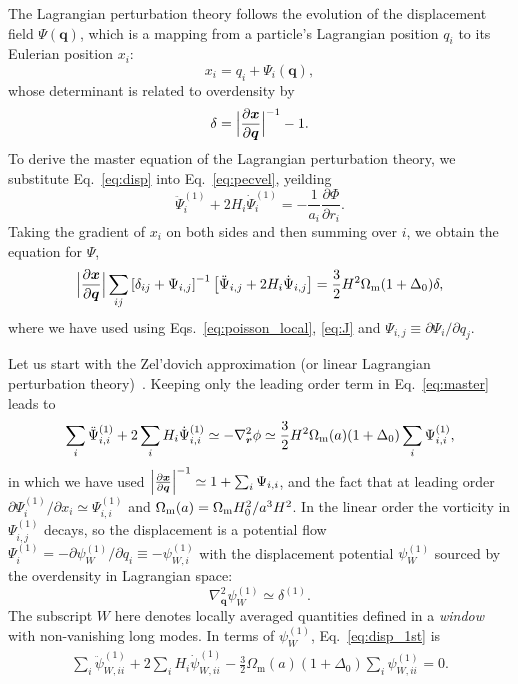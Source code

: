 \documentclass[a4paper,11pt]{article}
\newcommand{\vr}{{\bm r}}
\newcommand{\vx}{{\bm x}}
\newcommand{\vq}{{\bm q}}
\begin{document}
The Lagrangian perturbation theory follows the evolution of the displacement field $\Psi(\vq)$,
which is a mapping from a particle's Lagrangian
position $q_i$ to its Eulerian position $x_i$:
\begin{equation}
    x_i = q_i + \Psi_i({\vq}),
    \label{eq:disp}
\end{equation}
whose determinant is related to overdensity by
\begin{equation}
    \delta = \Bigl| \frac{\partial{\vx}}{\partial{\vq}} \Bigr|^{-1} - 1.
    \label{eq:J}
\end{equation}
To derive the master equation of the Lagrangian perturbation theory,  we substitute Eq.~\eqref{eq:disp} into Eq.~\eqref{eq:pecvel}, yeilding
\begin{equation}
    \ddot \Psi_i^{(1)} + 2 H_i \dot \Psi_i^{(1)} = - \frac1{a_i}
    \frac{\partial\Phi}{\partial r_i}.
\end{equation}
Taking the gradient of $x_i$ on both sides and then summing over $i$,
we obtain the equation for $\Psi$,
\begin{align}
    \Bigl| \frac{\partial{\vx}}{\partial{\vq}} \Bigr|
    \sum_{ij}
    \left[\delta_{ij} + \Psi_{i,j}  \right]^{-1}
    \left[ \ddot{\Psi}_{i,j} + 2H_i\dot{\Psi}_{i,j} \right]
    =\frac{3}{2}H^2\Omega_{\rm m}(1+\Delta_0)
    \delta,
    \label{eq:master}
\end{align}
where we have used using Eqs.~\eqref{eq:poisson_local}, \eqref{eq:J} and $\Psi_{i,j} \equiv \partial\Psi_i / \partial q_j$.


Let us start with the Zel'dovich approximation (or linear Lagrangian
perturbation theory)~\cite{Zeldovich:1969}.
Keeping only the leading order term in Eq.~\eqref{eq:master} leads to
\begin{equation}
    \sum_i\ddot \Psi_{i,i}^{(1)} + 2 \sum_i H_i \dot \Psi_{i,i}^{(1)} \simeq - \nabla_{\vr}^2 \phi
    \simeq \frac{3}{2}H^2 \Omega_{\rm m}(a)  (1 + \Delta_0)\sum_i\Psi_{i,i}^{(1)},
    \label{eq:disp_1st}
\end{equation}
in which we have used $\Bigl| \frac{\partial{\vx}}{\partial{\vq}} \Bigr|^{-1} \simeq 1 + \sum_i\Psi_{i,i}$,
 and the fact that at leading order $\partial\Psi_i^{(1)} / \partial x_i \simeq \Psi_{i,i}^{(1)}$
and $\Omega_{\rm m}(a) =  \Omega_{\rm m}H_0^2/a^3H^2$.
In the linear order the vorticity in $\Psi_{i,j}^{(1)}$ decays, so the displacement
is a potential flow $\Psi_i^{(1)} = - \partial\psi_W^{(1)}/ \partial q_i \equiv -\psi_{W,i}^{(1)}$
with the displacement potential $\psi_W^{(1)}$ sourced by the overdensity in Lagrangian
space:
\begin{equation}
    \nabla_{\vq}^2 \psi_W^{(1)} \simeq \delta^{(1)}.
\end{equation}
The subscript $W$ here
denotes locally averaged quantities
defined in a \emph{window} with non-vanishing long modes.
In terms of $\psi_W^{(1)}$, Eq.~\eqref{eq:disp_1st} is
\begin{align}
  \sum_i \ddot \psi^{(1)}_{W,ii} + 2\sum_i H_i  \dot\psi^{(1)}_{W,ii}
   - \frac32  \Omega_\mathrm{m}(a) (1 + \Delta_0)\sum_i \psi^{(1)}_{W,ii} = 0.
   \label{eq:psiW_1st}
\end{align}
\end{document}
